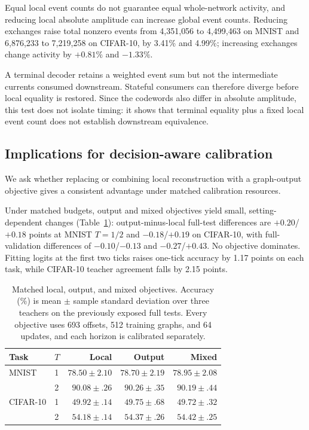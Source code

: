\documentclass[10pt,twocolumn,letterpaper]{article}
\begin{document}
Equal local event counts do not guarantee equal whole-network activity, and reducing local absolute amplitude can increase global event counts. Reducing exchanges raise total nonzero events from 4{,}351{,}056 to 4{,}499{,}463 on MNIST and 6{,}876{,}233 to 7{,}219{,}258 on CIFAR-10, by 3.41\% and 4.99\%; increasing exchanges change activity by $+0.81\%$ and $-1.33\%$.

A terminal decoder retains a weighted event sum but not the intermediate currents consumed downstream. Stateful consumers can therefore diverge before local equality is restored. Since the codewords also differ in absolute amplitude, this test does not isolate timing: it shows that terminal equality plus a fixed local event count does not establish downstream equivalence.


\subsection{Implications for decision-aware calibration}
We ask whether replacing or combining local reconstruction with a graph-output objective gives a consistent advantage under matched calibration resources.

Under matched budgets, output and mixed objectives yield small, setting-dependent changes (Table~\ref{tab:calibration}): output-minus-local full-test differences are $+0.20$/$+0.18$ points at MNIST $T{=}1/2$ and $-0.18$/$+0.19$ on CIFAR-10, with full-validation differences of $-0.10$/$-0.13$ and $-0.27$/$+0.43$. No objective dominates. Fitting logits at the first two ticks raises one-tick accuracy by 1.17 points on each task, while CIFAR-10 teacher agreement falls by 2.15 points.

\begin{table}[t]
\caption{Matched local, output, and mixed objectives. Accuracy (\%) is mean $\pm$ sample standard deviation over three teachers on the previously exposed full tests. Every objective uses 693 offsets, 512 training graphs, and 64 updates, and each horizon is calibrated separately.}
\label{tab:calibration}
\centering\small
\setlength{\tabcolsep}{3.5pt}
\begin{tabular}{llrrr}\toprule
Task & $T$ & Local & Output & Mixed\\\midrule
MNIST & 1 & $78.50\pm2.10$ & $78.70\pm2.19$ & $78.95\pm2.08$\\
 & 2 & $90.08\pm.26$ & $90.26\pm.35$ & $90.19\pm.44$\\
CIFAR-10 & 1 & $49.92\pm.14$ & $49.75\pm.68$ & $49.72\pm.32$\\
 & 2 & $54.18\pm.14$ & $54.37\pm.26$ & $54.42\pm.25$\\\bottomrule
\end{tabular}
\end{table}
\end{document}
